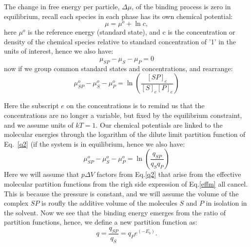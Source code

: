 The change in free energy per particle, $\Delta \mu$, of the binding process is zero in equilibrium, recall each species in each phase has its own chemical potential:
\begin{equation}\label{chemc}
 \mu = \mu^o + \ln{c},
 \end{equation}
  here $\mu^o$ is the reference energy (standard state), and c is the concentration or density of the chemical species relative to standard concentration of '1' in the units of interest, hence we also have:
\begin{equation}
 \mu_{SP} - \mu_S - \mu_P   = 0
\end{equation}
now if we group common standard states and concentrations, and rearrange:
\begin{equation}\label{}
  \mu_{SP}^o - \mu_S^o - \mu_P^o = \ln( \frac{ [SP]_e }{[S]_e [P]_e} )
\end{equation}


Here the subscript $e$ on the concentrations is to remind us that the concentrations are no longer a variable, but fixed by the equilibrium constraint, and we assume units of $kT=1$.  Our chemical potentials are linked to the molecular energies through the logarithm of the dilute limit partition function of Eq.~\ref{q2} (if the system is in equilibrium, hence we also have:
\begin{equation}\label{effm}
  \mu_{SP}^o - \mu_S^o - \mu_P^o = \ln( \frac{ q_{SP} } { q_S q_P })
\end{equation}
Here we will assume that $p\Delta V$ factors from Eq.\ref{q2} that arise from the effective molecular partition functions from the righ side expression of Eq.\ref{effm} all cancel.  This is because the pressure is constant, and we will assume the volume of the complex $SP$ is roufly the additive volume of the molecules $S$ and $P$ in isolation in the solvent.  Now we see that the binding energy emerges from the ratio of partition functions, hence, we define a new partition function as:
\begin{equation}\label{}
  q = \frac{ q_{SP} } { q_S } = q_{P} e^{(-E_b)}.
\end{equation}

